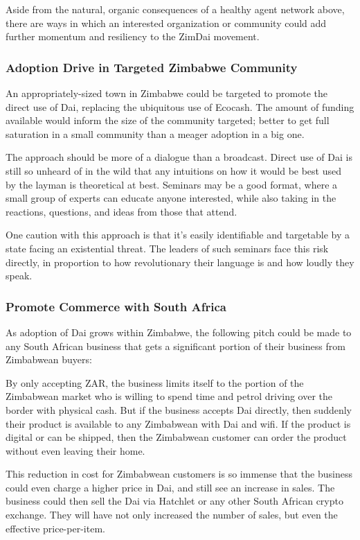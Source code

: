 \documentclass{article}
\begin{document}
Aside from the natural, organic consequences of a healthy agent network above, there are ways in which an interested organization or community could add further momentum and resiliency to the ZimDai movement.

\subsubsection{Adoption Drive in Targeted Zimbabwe Community} \label{targeted community}

An appropriately-sized town in Zimbabwe could be targeted to promote the direct use of Dai, replacing the ubiquitous use of Ecocash. The amount of funding available would inform the size of the community targeted; better to get full saturation in a small community than a meager adoption in a big one.

The approach should be more of a dialogue than a broadcast. Direct use of Dai is still so unheard of in the wild that any intuitions on how it would be best used by the layman is theoretical at best. Seminars may be a good format, where a small group of experts can educate anyone interested, while also taking in the reactions, questions, and ideas from those that attend.

One caution with this approach is that it's easily identifiable and targetable by a state facing an existential threat. The leaders of such seminars face this risk directly, in proportion to how revolutionary their language is and how loudly they speak.

\subsubsection{Promote Commerce with South Africa} \label{promote south africa}

As adoption of Dai grows within Zimbabwe, the following pitch could be made to any South African business that gets a significant portion of their business from Zimbabwean buyers:

By only accepting ZAR, the business limits itself to the portion of the Zimbabwean market who is willing to spend time and petrol driving over the border with physical cash. But if the business accepts Dai directly, then suddenly their product is available to any Zimbabwean with Dai and wifi. If the product is digital or can be shipped, then the Zimbabwean customer can order the product without even leaving their home.

This reduction in cost for Zimbabwean customers is so immense that the business could even charge a higher price in Dai, and still see an increase in sales. The business could then sell the Dai via Hatchlet or any other South African crypto exchange. They will have not only increased the number of sales, but even the effective price-per-item.
\end{document}
